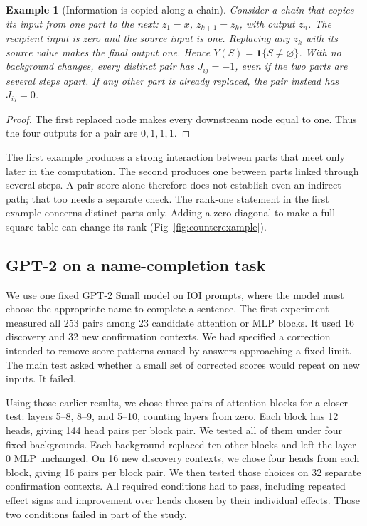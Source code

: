 \documentclass[11pt,letterpaper]{article}
\newtheorem{proposition}{Example}
\begin{document}
\begin{proposition}[Information is copied along a chain]
Consider a chain that copies its input from one part to the next:
$z_1=x$, $z_{k+1}=z_k$, with output $z_n$.
The recipient input is zero and the source input is one. Replacing any $z_k$
with its source value makes the final output one. Hence
$Y(S)=\mathbf1\{S\ne\varnothing\}$. With no background changes,
every distinct pair has $J_{ij}=-1$, even if the two parts are several steps
apart. If any other part is already replaced, the pair instead has $J_{ij}=0$.
\end{proposition}
\begin{proof}
The first replaced node makes every downstream node equal to one. Thus the
four outputs for a pair are $0,1,1,1$.
\end{proof}
The first example produces a strong interaction between parts that meet only
later in the computation. The second produces one between parts linked through
several steps. A pair score alone therefore does not establish even an indirect
path; that too needs a separate check. The rank-one statement in the first
example concerns distinct parts only. Adding a zero diagonal to make a full
square table can change its rank (Fig~\ref{fig:counterexample}).




\subsection*{GPT-2 on a name-completion task}
We use one fixed GPT-2 Small model on IOI prompts, where the model must choose
the appropriate name to complete a sentence. The first experiment measured
all 253 pairs among 23 candidate attention or MLP blocks. It used 16 discovery
and 32 new confirmation contexts. We had specified a correction intended to
remove score patterns caused by answers approaching a fixed limit. The main
test asked whether a small set of corrected scores would repeat on new
inputs. It failed.

Using those earlier results, we chose three pairs of attention blocks for a
closer test: layers 5--8, 8--9, and 5--10, counting layers from zero. Each
block has 12 heads, giving 144 head pairs per block pair. We tested all of
them under four fixed backgrounds. Each background replaced ten other blocks
and left the layer-0 MLP unchanged. On 16 new discovery contexts, we chose
four heads from each block, giving 16 pairs per block pair. We then tested
those choices on 32 separate confirmation contexts. All required conditions
had to pass, including repeated effect signs and improvement over heads chosen
by their individual effects. Those two conditions failed in part of the study.
\end{document}

